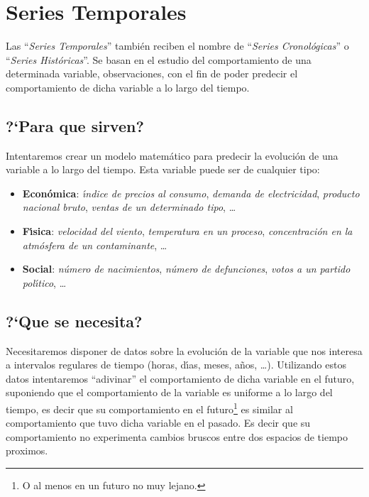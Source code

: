 %
%

\section{Series Temporales}

Las ``\emph{Series Temporales}'' tambi\'en reciben el nombre de ``\emph{Series
Cronol\'ogicas}'' o ``\emph{Series Hist\'oricas}''. Se basan en el estudio del
comportamiento de una determinada variable, observaciones, con el fin de poder
predecir el comportamiento de dicha variable a lo largo del tiempo.

\subsection{?`Para que sirven?}

Intentaremos crear un modelo matem\'atico para predecir la evoluci\'on de una
variable a lo largo del tiempo. Esta variable puede ser de cualquier tipo:

\begin{itemize}
\item \textbf{Econ\'omica}: \emph{\'{\i}ndice de precios al consumo},
\emph{demanda de electricidad}, \emph{producto nacional bruto}, \emph{ventas
de un determinado tipo}, \ldots
\item \textbf{F\'{\i}sica}: \emph{velocidad del viento}, \emph{temperatura en
un proceso}, \emph{concentraci\'on en la atm\'osfera de un contaminante}, \ldots
\item \textbf{Social}: \emph{n\'umero de nacimientos}, \emph{n\'umero de
defunciones}, \emph{votos a un partido pol\'{\i}tico}, \ldots 
\end{itemize}

\newpage

\subsection{?`Que se necesita?}

Necesitaremos disponer de datos sobre la evoluci\'on de la variable que nos 
interesa a intervalos regulares de tiempo (horas, d\'{\i}as, meses, a\~nos,
\ldots). Utilizando estos datos intentaremos ``adivinar'' el comportamiento de
dicha variable en el futuro, suponiendo que el comportamiento de la variable es
uniforme a lo largo del tiempo, es decir que su comportamiento en el
futuro\footnote{O al menos en un futuro no muy lejano.} es similar al 
comportamiento que tuvo dicha variable en el pasado. Es decir que su
comportamiento no experimenta cambios bruscos entre dos espacios de tiempo
proximos.\\

